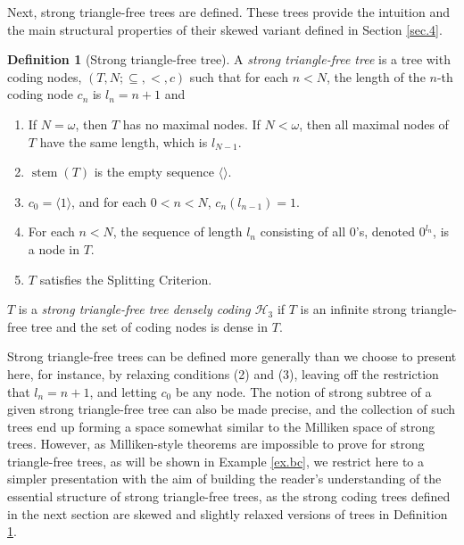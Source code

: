 \documentclass{amsart}
\theoremstyle{remark}
\theoremstyle{definition}
\newtheorem{defn}[thm]{Definition}
\theoremstyle{remark}
\newcommand{\om}{\omega}
\newcommand{\sse}{\subseteq}
\DeclareMathOperator{\stem}{stem}
\newcommand{\lgl}{\langle}
\newcommand{\rgl}{\rangle}
\begin{document}
Next, strong triangle-free trees are defined.
These trees provide the intuition and the main structural properties of their skewed variant defined in Section  \ref{sec.4}.




\begin{defn}[Strong triangle-free tree]\label{defn.stft}
A {\em strong triangle-free tree} is  a tree with coding nodes, $(T,N;\sse,<,c)$ such that
for each $n<N$, the length of the $n$-th coding node $c_n$ is $l_n=n+1$ and
\begin{enumerate}
\item
If $N=\om$, then $T$ has no maximal nodes.
 If $N<\om$, then all maximal nodes of $T$ have the same length,  which is  $l_{N-1}$.
\item
$\stem(T)$ is the empty sequence $\lgl\rgl$.
\item
$c_0 = \lgl 1\rgl$, and
for each $0<n<N$,   $c_n(l_{n-1})=1$.
\item
For each $n<N$, the sequence of length $l_n$ consisting of all $0$'s, denoted $0^{l_n}$, is a node in $T$.
\item
$T$ satisfies the Splitting Criterion.
\end{enumerate}
$T$ is a {\em strong triangle-free tree densely coding $\mathcal{H}_3$} if $T$ is an infinite  strong triangle-free tree and
the set of coding nodes  is dense in $T$.
\end{defn}



Strong triangle-free trees  can be defined more generally than  we choose to  present here,  for instance,
 by relaxing conditions (2) and  (3),  leaving off the restriction  that $l_n=n+1$, and letting $c_0$ be any node.
The notion of strong  subtree of a given strong triangle-free tree  can also  be made precise, and the collection of such trees  end up forming  a space somewhat similar
 to the Milliken space of strong trees.
However, as
Milliken-style theorems are  impossible to prove for
strong triangle-free trees, as will be shown in Example \ref{ex.bc},
we restrict here to  a
 simpler   presentation
with the aim of
 building  the reader's understanding of the essential structure of strong triangle-free trees,
as the
 strong coding trees defined  in the next section  are skewed and slightly relaxed  versions of trees in Definition \ref{defn.stft}.
\end{document}
